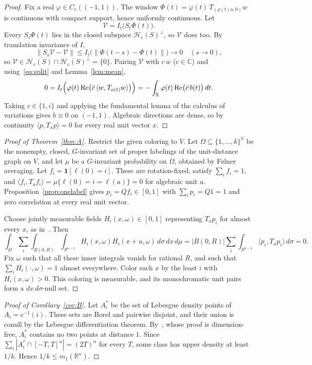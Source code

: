 \documentclass[11pt]{amsart}
\theoremstyle{definition}
\newcommand{\R}{\mathbb{R}}
\newcommand{\C}{\mathbb{C}}
\newcommand{\cH}{\mathcal{H}}
\begin{document}
\begin{proof}
Fix a real $\varphi\in C_c((-1,1))$. The window $\Phi(t)=\varphi(t)\,T_{(\rho(t)u,0)}w$ is continuous with compact support, hence uniformly continuous. Let
\[
\mathcal V=I_t\bigl(S_t\Phi(t)\bigr).
\]
Every $S_t\Phi(t)$ lies in the closed subspace $\cH_c(S)^\perp$, so $\mathcal V$ does too. By translation invariance of $I$,
\[
\|S_s\mathcal V-\mathcal V\|\le I_t\bigl(\|\Phi(t-s)-\Phi(t)\|\bigr)\to0\quad(s\to0),
\]
so $\mathcal V\in\cH_c(S)\cap\cH_c(S)^\perp=\{0\}$. Pairing $\mathcal V$ with $c\,w$ ($c\in\C$) and using~\eqref{eq:split} and Lemma~\ref{lem:mean},
\[
0=I_t\Bigl(\varphi(t)\,\mathrm{Re}\bigl(\bar c\,\langle w,T_{a(t)}w\rangle\bigr)\Bigr)=-\int_\R\varphi(t)\,\mathrm{Re}\bigl(\bar c\,b(t)\bigr)\,dt .
\]
Taking $c\in\{1,i\}$ and applying the fundamental lemma of the calculus of variations gives $b\equiv0$ on $(-1,1)$. Algebraic directions are dense, so by continuity $\langle p,T_xp\rangle=0$ for every real unit vector $x$.
\end{proof}

\begin{proof}[Proof of Theorem~\ref{thm:A}]
Restrict the given coloring to $V$. Let $\Omega\subseteq\{1,\dots,k\}^V$ be the nonempty, closed, $G$-invariant set of proper labelings of the unit-distance graph on $V$, and let $\mu$ be a $G$-invariant probability on $\Omega$, obtained by Følner averaging. Let $f_i=\mathbf 1[\ell(0)=i]$. These are rotation-fixed, satisfy $\sum_if_i=1$, and $\langle f_i,T_af_i\rangle=\mu\{\ell(0)=i=\ell(a)\}=0$ for algebraic unit $a$. Proposition~\ref{prop:onelabel} gives $p_i=Qf_i\in[0,1]$ with $\sum_ip_i=Q1=1$ and zero correlation at every real unit vector.

Choose jointly measurable fields $H_i(x,\omega)\in[0,1]$ representing $T_xp_i$ for almost every $x$, as in~\cite[proof of Proposition 4.2]{OAI}. Then
\[
\int_\Omega\sum_i\int_{B(0,R)}\int_{S^{n-1}}H_i(x,\omega)H_i(x+u,\omega)\,d\sigma\,dx\,d\mu=|B(0,R)|\sum_i\int_{S^{n-1}}\langle p_i,T_up_i\rangle\,d\sigma=0 .
\]
Fix $\omega$ such that all these inner integrals vanish for rational $R$, and such that $\sum_iH_i(\cdot,\omega)=1$ almost everywhere. Color each $x$ by the least $i$ with $H_i(x,\omega)>0$. This coloring is measurable, and its monochromatic unit pairs form a $dx\,d\sigma$-null set.
\end{proof}

\begin{proof}[Proof of Corollary~\ref{cor:B}]
Let $A_i^*$ be the set of Lebesgue density points of $A_i=c^{-1}(i)$. These sets are Borel and pairwise disjoint, and their union is conull by the Lebesgue differentiation theorem. By~\cite[Lemma 4.3]{OAI}, whose proof is dimension-free, $A_i^*$ contains no two points at distance $1$. Since $\sum_i|A_i^*\cap[-T,T]^n|=(2T)^n$ for every $T$, some class has upper density at least $1/k$. Hence $1/k\le m_1(\R^n)$.
\end{proof}
\end{document}
